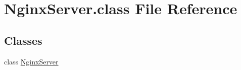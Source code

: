 \hypertarget{NginxServer_8class}{\section{Nginx\-Server.\-class File Reference}
\label{NginxServer_8class}
}
\subsection*{Classes}
\begin{DoxyCompactItemize}
\item 
class \hyperlink{classNginxServer}{Nginx\-Server}
\end{DoxyCompactItemize}
